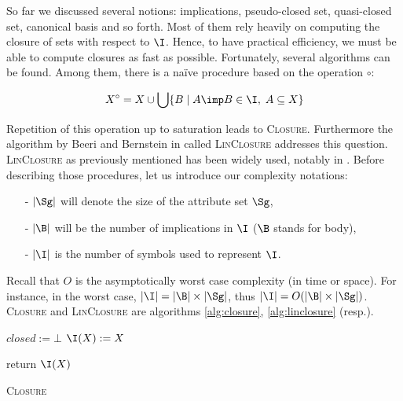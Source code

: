 \documentclass[a4paper, 10pt]{article}
\begin{document}
So far we discussed several notions: implications, pseudo-closed set, 
quasi-closed set, canonical basis and so forth. Most of them rely heavily on
computing the closure of sets with respect to $\I$. Hence, to have practical 
efficiency, we must be able to compute closures as fast as possible. 
Fortunately, several algorithms can be found. Among them, there is a naïve
procedure based on the operation $\circ$:

\[ X^{\circ} = 
X \cup \bigcup \{ B \; | \; A \imp B \in \I, \; A \subseteq X \} \]

Repetition of this operation up to saturation leads to \textsc{Closure}. Furthermore the algorithm by Beeri and Bernstein in \cite{beeri_computational_1979} called \textsc{LinClosure} addresses this question. \textsc{LinClosure} as previously mentioned has been widely used, notably in \cite{maier_theory_1983, maier_minimum_1980, ganter_conceptual_2016, shock_computing_1986, day_lattice_1992}. Before describing those procedures, let us introduce our complexity notations:
\begin{itemize}
	\item[-] $|\Sg|$ will denote the size of the attribute set $\Sg$,
	\item[-] $|\B|$ will be the number of implications in $\I$ ($\B$ stands
	for body),
	\item[-] $|\I|$ is the number of symbols used to represent $\I$.
\end{itemize}
Recall that $O$ is the asymptotically worst case complexity (in time or space). For instance, in the worst case, $|\I| = |\B|\times|\Sg|$, thus $|\I| = O(|\B|\times|\Sg|)$. \textsc{Closure} and \textsc{LinClosure} are algorithms \ref{alg:closure}, \ref{alg:linclosure} (resp.). 

\vspace{1.2em}

\begin{algorithm}[ht]
	
	\BlankLine
	\BlankLine
	
	$closed := \bot$ \;
	$\I(X) := X$ \;
	
	\BlankLine
	
	return $\I(X)$\;
	
	\caption{\textsc{Closure}}
	\label{alg:closure}
\end{algorithm}
\end{document}
